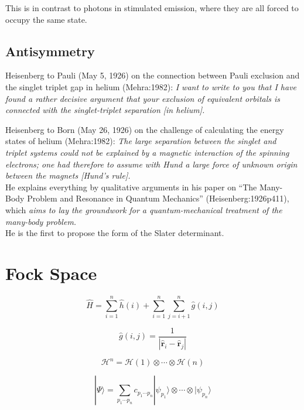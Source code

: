 This is in contrast to photons in stimulated emission, where they are all forced
to occupy the same state.

\subsection{Antisymmetry}

Heisenberg to Pauli (May 5, 1926) on the connection between Pauli exclusion and
the singlet triplet gap in helium (Mehra:1982):
{\itshape
    I want to write to you that I have found a rather decisive argument that
    your exclusion of equivalent orbitals is connected with the singlet-triplet
    separation [in helium].
}

Heisenberg to Born (May 26, 1926) on the challenge of calculating the energy
states of helium (Mehra:1982):
{\itshape
    The large separation between the singlet and triplet systems could not be
    explained by a magnetic interaction of the spinning electrons; one had
    therefore to assume with Hund a large force of unknown origin between the
    magnets [Hund's rule].
}
\\
He explains everything by qualitative arguments in his paper on ``The Many-Body
Problem and Resonance in Quantum Mechanics'' (Heisenberg:1926p411), which
{\itshape
    aims to lay the groundwork for a quantum-mechanical treatment of the
    many-body problem.
}
\\
He is the first to propose the form of the Slater determinant.



\section{Fock Space}

\begin{equation}
    \hat{H}
    =
    \sum_{i=1}^n
    \hat{h}(i)
    +
    \sum_{i=1}^n
    \sum_{j=i+1}^n
    \hat{g}(i,j)
\end{equation}

\begin{equation}
    \hat{g}(i,j)
    =
    \frac{1}{|\hat{\mathbf{r}}_i-\hat{\mathbf{r}}_j|}
\end{equation}

\begin{equation}
    \mathcal{H}^n
    =
    \mathcal{H}(1)\otimes\cdots\otimes\mathcal{H}(n)
\end{equation}

\begin{equation}
    |\Psi\rangle
    =
    \sum_{p_1\cdots p_n}
    c_{p_1\cdots p_n}
    |\psi_{p_1}\rangle
    \otimes
    \cdots
    \otimes
    |\psi_{p_n}\rangle
\end{equation}
